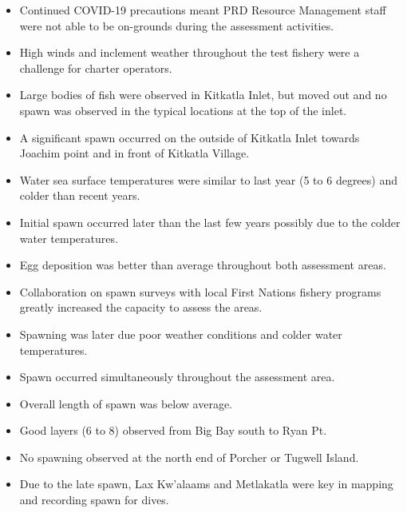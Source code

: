 \begin{itemize}
\item Continued COVID-19 precautions meant PRD Resource Management staff were
not able to be on-grounds during the assessment activities.
\item High winds and inclement weather throughout the test fishery were a challenge for charter operators.
\item Large bodies of fish were observed in Kitkatla Inlet, but
moved out and no spawn was observed in the typical locations at the top of the inlet.
\item A significant spawn occurred on the outside of Kitkatla Inlet
towards Joachim point and in front of Kitkatla Village.
\item Water sea surface temperatures were similar to last year (5 to 6 degrees) and colder than recent years.
\item Initial spawn occurred later than the last few years possibly due to the colder water temperatures.
\item Egg deposition was better than average throughout both assessment areas.
\item Collaboration on spawn surveys with local First Nations fishery programs
greatly increased the capacity to assess the areas.

\item Spawning was later due poor weather conditions and colder water temperatures.
\item Spawn occurred simultaneously throughout the assessment area.
\item Overall length of spawn was below average.
\item Good layers (6 to 8) observed from Big Bay south to Ryan Pt.
\item No spawning observed at the north end of Porcher or Tugwell Island.
\item Due to the late spawn,
Lax Kw'alaams and Metlakatla were key in mapping and recording spawn for dives.
\end{itemize}